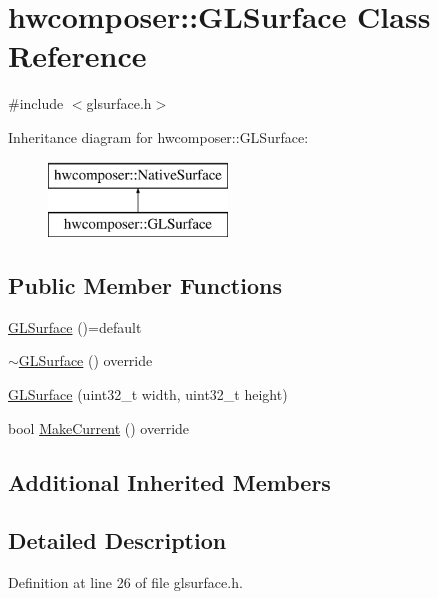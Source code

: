 \hypertarget{classhwcomposer_1_1GLSurface}{}\section{hwcomposer\+:\+:G\+L\+Surface Class Reference}
\label{classhwcomposer_1_1GLSurface}


{\ttfamily \#include $<$glsurface.\+h$>$}

Inheritance diagram for hwcomposer\+:\+:G\+L\+Surface\+:\begin{figure}[H]
\begin{center}
\leavevmode
\includegraphics[height=2.000000cm]{classhwcomposer_1_1GLSurface}
\end{center}
\end{figure}
\subsection*{Public Member Functions}
\begin{DoxyCompactItemize}
\item 
\mbox{\hyperlink{classhwcomposer_1_1GLSurface_a6991d7d1f3fe126c67033052a93376d4}{G\+L\+Surface}} ()=default
\item 
\mbox{\hyperlink{classhwcomposer_1_1GLSurface_a94567e025b956b3a1fe65837d721ab99}{$\sim$\+G\+L\+Surface}} () override
\item 
\mbox{\hyperlink{classhwcomposer_1_1GLSurface_ac971667e5cfd76fd34f551e3e8547e9a}{G\+L\+Surface}} (uint32\+\_\+t width, uint32\+\_\+t height)
\item 
bool \mbox{\hyperlink{classhwcomposer_1_1GLSurface_a5d2720365cbfe670344bc74831a7895a}{Make\+Current}} () override
\end{DoxyCompactItemize}
\subsection*{Additional Inherited Members}


\subsection{Detailed Description}


Definition at line 26 of file glsurface.\+h.



